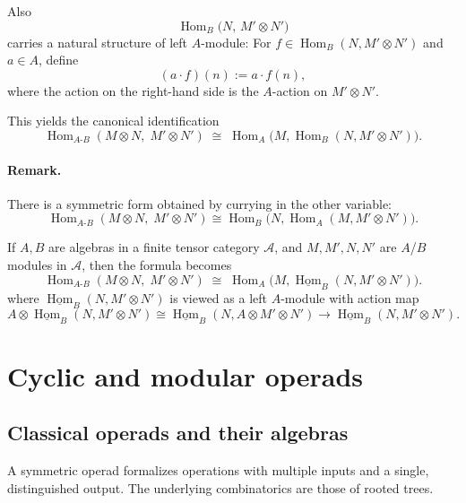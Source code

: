 \documentclass[11pt]{article}
\theoremstyle{definition}
\begin{document}
Also 
\[
\operatorname{Hom}_B\!\big(N,\, M' \otimes N'\big)
\]
carries a natural structure of left $A$-module: For $f \in \operatorname{Hom}_B(N, M' \otimes N')$ and $a \in A$, define
\[
(a \cdot f)(n) := a \cdot f(n),
\]
where the action on the right-hand side is the $A$-action on $M' \otimes N'$.


This yields the canonical identification
\[
\boxed{
\operatorname{Hom}_{A\text{-}B}(M \otimes N,\; M' \otimes N')
\;\cong\;
\operatorname{Hom}_A\!\big(M,\operatorname{Hom}_B(N, M' \otimes N')\big).
}
\]

\paragraph{Remark.}
There is a symmetric form obtained by currying in the other variable:
\[
\operatorname{Hom}_{A\text{-}B}(M \otimes N,\; M' \otimes N')
\cong
\operatorname{Hom}_B\!\big(N,\operatorname{Hom}_A(M, M' \otimes N')\big).
\]




If $A,B$ are algebras in a finite tensor category $\mathcal{A}$, and $M,M',N,N'$ are $A$/$B$ modules in $\mathcal{A}$, then the formula becomes 
\[
\boxed{
\operatorname{Hom}_{A\text{-}B}(M \otimes N,\; M' \otimes N')
\;\cong\;
\operatorname{Hom}_A\!\big(M,\underline{\operatorname{Hom}}_B(N, M' \otimes N')\big).
}
\]
where $\underline{\operatorname{Hom}}_B(N, M' \otimes N')$ is viewed as a left $A$-module with action map
$$A \otimes\underline{\operatorname{Hom}}_B(N, M' \otimes N') \cong \underline{\operatorname{Hom}}_B(N, A \otimes M' \otimes N') \to \underline{\operatorname{Hom}}_B(N, M' \otimes N').$$

\section{Cyclic and modular operads}





\subsection{Classical operads and their algebras}

A symmetric operad formalizes operations with multiple inputs and a single, distinguished output. The underlying combinatorics are those of rooted trees.
\end{document}
